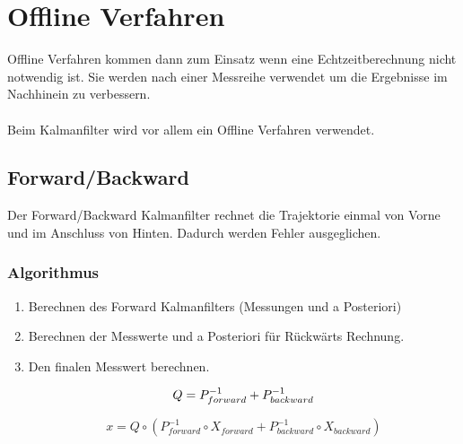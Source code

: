\chapter{Offline Verfahren}
\label{chp:offlineVerfahren}

Offline Verfahren kommen dann zum Einsatz wenn eine Echtzeitberechnung nicht notwendig ist. Sie werden nach einer Messreihe verwendet um die Ergebnisse im Nachhinein zu verbessern. \\
\\
Beim Kalmanfilter wird vor allem ein Offline Verfahren verwendet.

\section{Forward/Backward}

Der Forward/Backward Kalmanfilter rechnet die Trajektorie einmal von Vorne und im Anschluss von Hinten. Dadurch werden Fehler ausgeglichen. 

\subsection{Algorithmus}

\begin{enumerate}
	\item Berechnen des Forward Kalmanfilters (Messungen und a Posteriori)
	\item Berechnen der Messwerte und a Posteriori für Rückwärts Rechnung.
	\item Den finalen Messwert berechnen.

\begin{equation}
	Q = P_{forward}^{-1} + P_{backward}^{-1} \\
\end{equation}

\begin{equation}
	x = Q \circ ( P_{forward}^{-1} \circ X_{forward} + P_{backward}^{-1} \circ X_{backward} )
\end{equation}
\end{enumerate}

